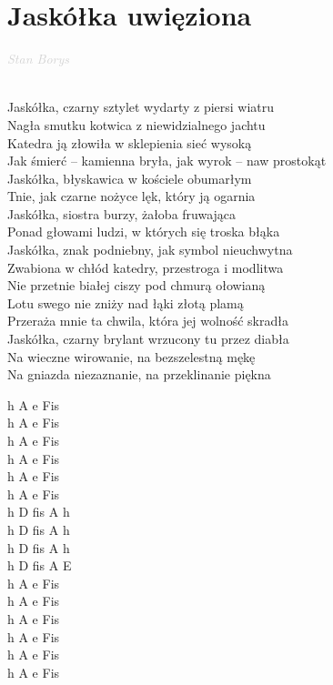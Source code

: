 \documentclass[a5paper, 10pt]{book}
\begin{document}
\section{Jaskółka uwięziona}\textcolor{lightgray}{\textit{Stan Borys}}\\~\\
\begin{minipage}[t]{0.8\textwidth}
Jaskółka, czarny sztylet wydarty z piersi wiatru\\
Nagła smutku kotwica z niewidzialnego jachtu\\
Katedra ją złowiła w sklepienia sieć wysoką\\
Jak śmierć – kamienna bryła, jak wyrok – naw prostokąt\\
Jaskółka, błyskawica w kościele obumarłym\\
Tnie, jak czarne nożyce lęk, który ją ogarnia\\

\hspace*{5mm}Jaskółka, siostra burzy, żałoba fruwająca\\
\hspace*{5mm}Ponad głowami ludzi, w których się troska błąka\\
\hspace*{5mm}Jaskółka, znak podniebny, jak symbol nieuchwytna\\
\hspace*{5mm}Zwabiona w chłód katedry, przestroga i modlitwa\\

Nie przetnie białej ciszy pod chmurą ołowianą\\
Lotu swego nie zniży nad łąki złotą plamą\\
Przeraża mnie ta chwila, która jej wolność skradła\\
Jaskółka, czarny brylant wrzucony tu przez diabła\\

Na wieczne wirowanie, na bezszelestną mękę\\
Na gniazda niezaznanie, na przeklinanie piękna\\
\end{minipage}
\begin{minipage}[t]{0.2\textwidth}
h A e Fis\\h A e Fis\\h A e Fis\\h A e Fis\\h A e Fis\\h A e Fis\\

h D fis A h\\
h D fis A h\\
h D fis A h\\
h D fis A E\\

h A e Fis\\h A e Fis\\h A e Fis\\h A e Fis\\

h A e Fis\\h A e Fis\\
\end{minipage}
\end{document}
